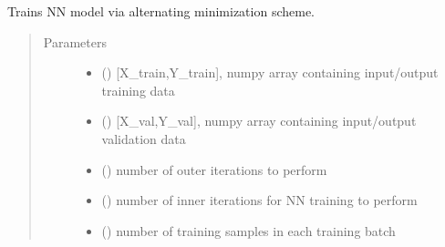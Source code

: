 \documentclass[letterpaper,10pt,english]{sphinxmanual}
\begin{document}
\begin{fulllineitems}
\begin{fulllineitems}
\label{\detokenize{rom:rom.response_surfaces.NN_alt.train}}
\sphinxAtStartPar
Trains NN model via alternating minimization scheme.
\begin{quote}\begin{description}
\item[{Parameters}] \leavevmode\begin{itemize}
\item {} 
\sphinxAtStartPar
{} (\sphinxstyleliteralemphasis{\sphinxupquote{,}}) \textendash{} {[}X\_train,Y\_train{]}, numpy array containing input/output training data

\item {} 
\sphinxAtStartPar
{} (\sphinxstyleliteralemphasis{\sphinxupquote{,}}) \textendash{} {[}X\_val,Y\_val{]}, numpy array containing input/output validation data

\item {} 
\sphinxAtStartPar
{} () \textendash{} number of outer iterations to perform

\item {} 
\sphinxAtStartPar
{} () \textendash{} number of inner iterations for NN training to perform

\item {} 
\sphinxAtStartPar
{} () \textendash{} number of training samples in each training batch


\end{itemize}
\end{description}
\end{quote}
\end{fulllineitems}
\end{fulllineitems}
\end{document}
